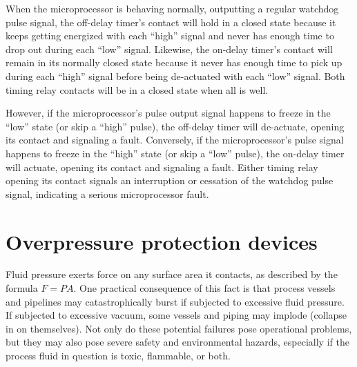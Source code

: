 When the microprocessor is behaving normally, outputting a regular watchdog pulse signal, the off-delay timer's contact will hold in a closed state because it keeps getting energized with each ``high'' signal and never has enough time to drop out during each ``low'' signal.  Likewise, the on-delay timer's contact will remain in its normally closed state because it never has enough time to pick up during each ``high'' signal before being de-actuated with each ``low'' signal.  Both timing relay contacts will be in a closed state when all is well.

However, if the microprocessor's pulse output signal happens to freeze in the ``low'' state (or skip a ``high'' pulse), the off-delay timer will de-actuate, opening its contact and signaling a fault.  Conversely, if the microprocessor's pulse signal happens to freeze in the ``high'' state (or skip a ``low'' pulse), the on-delay timer will actuate, opening its contact and signaling a fault.  Either timing relay opening its contact signals an interruption or cessation of the watchdog pulse signal, indicating a serious microprocessor fault.













\filbreak
\section{Overpressure protection devices}

\label{overpressure_protection}

Fluid pressure exerts force on any surface area it contacts, as described by the formula $F = PA$.  One practical consequence of this fact is that process vessels and pipelines may catastrophically burst if subjected to excessive fluid pressure.  If subjected to excessive vacuum, some vessels and piping may implode (collapse in on themselves).  Not only do these potential failures pose operational problems, but they may also pose severe safety and environmental hazards, especially if the process fluid in question is toxic, flammable, or both.


